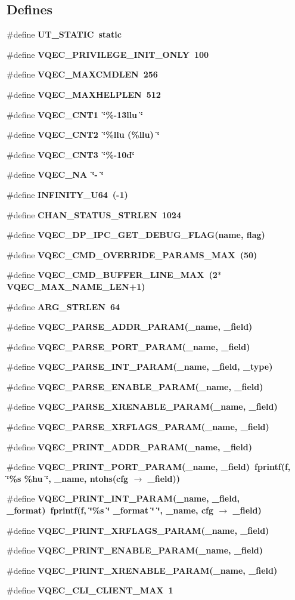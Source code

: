 \subsection*{Defines}
\begin{CompactItemize}
\item 
\#define \bf{UT\_\-STATIC}~static
\item 
\#define \bf{VQEC\_\-PRIVILEGE\_\-INIT\_\-ONLY}~100
\item 
\#define \bf{VQEC\_\-MAXCMDLEN}~256
\item 
\#define \bf{VQEC\_\-MAXHELPLEN}~512
\item 
\#define \bf{VQEC\_\-CNT1}~\char`\"{}\%-13llu \char`\"{}
\item 
\#define \bf{VQEC\_\-CNT2}~\char`\"{}\%llu (\%llu) \char`\"{}
\item 
\#define \bf{VQEC\_\-CNT3}~\char`\"{}\%-10d\char`\"{}
\item 
\#define \bf{VQEC\_\-NA}~\char`\"{}-             \char`\"{}
\item 
\#define \bf{INFINITY\_\-U64}~(-1)
\item 
\#define \bf{CHAN\_\-STATUS\_\-STRLEN}~1024
\item 
\#define \bf{VQEC\_\-DP\_\-IPC\_\-GET\_\-DEBUG\_\-FLAG}(name, flag)
\item 
\#define \bf{VQEC\_\-CMD\_\-OVERRIDE\_\-PARAMS\_\-MAX}~(50)
\item 
\#define \bf{VQEC\_\-CMD\_\-BUFFER\_\-LINE\_\-MAX}~(2$\ast$VQEC\_\-MAX\_\-NAME\_\-LEN+1)
\item 
\#define \bf{ARG\_\-STRLEN}~64
\item 
\#define \bf{VQEC\_\-PARSE\_\-ADDR\_\-PARAM}(\_\-name, \_\-field)
\item 
\#define \bf{VQEC\_\-PARSE\_\-PORT\_\-PARAM}(\_\-name, \_\-field)
\item 
\#define \bf{VQEC\_\-PARSE\_\-INT\_\-PARAM}(\_\-name, \_\-field, \_\-type)
\item 
\#define \bf{VQEC\_\-PARSE\_\-ENABLE\_\-PARAM}(\_\-name, \_\-field)
\item 
\#define \bf{VQEC\_\-PARSE\_\-XRENABLE\_\-PARAM}(\_\-name, \_\-field)
\item 
\#define \bf{VQEC\_\-PARSE\_\-XRFLAGS\_\-PARAM}(\_\-name, \_\-field)
\item 
\#define \bf{VQEC\_\-PRINT\_\-ADDR\_\-PARAM}(\_\-name, \_\-field)
\item 
\#define \bf{VQEC\_\-PRINT\_\-PORT\_\-PARAM}(\_\-name, \_\-field)~fprintf(f, \char`\"{}\%s \%hu \char`\"{}, \_\-name, ntohs(cfg $\rightarrow$ \_\-field))
\item 
\#define \bf{VQEC\_\-PRINT\_\-INT\_\-PARAM}(\_\-name, \_\-field, \_\-format)~fprintf(f, \char`\"{}\%s \char`\"{} \_\-format \char`\"{} \char`\"{}, \_\-name, cfg $\rightarrow$ \_\-field)
\item 
\#define \bf{VQEC\_\-PRINT\_\-XRFLAGS\_\-PARAM}(\_\-name, \_\-field)
\item 
\#define \bf{VQEC\_\-PRINT\_\-ENABLE\_\-PARAM}(\_\-name, \_\-field)
\item 
\#define \bf{VQEC\_\-PRINT\_\-XRENABLE\_\-PARAM}(\_\-name, \_\-field)
\item 
\#define \bf{VQEC\_\-CLI\_\-CLIENT\_\-MAX}~1
\end{CompactItemize}
